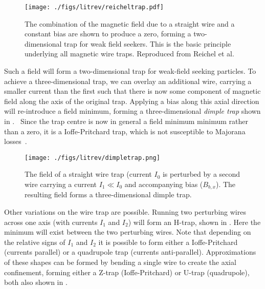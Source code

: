 \begin{figure}
  \texttt{[image: ./figs/litrev/reicheltrap.pdf]}
  \caption{The combination of the magnetic field due to a straight wire and a
  constant bias are shown to produce a zero, forming a two-dimensional trap for
  weak field seekers. This is the basic principle underlying all magnetic wire
  traps. Reproduced from Reichel et al.~\cite{Reichel1999}
  }
  \label{litrev:fig:reicheltrap}
\end{figure}

Such a field will form a two-dimensional trap for weak-field seeking particles.
To achieve a three-dimensional trap, we can overlay an additional wire,
carrying a smaller current than the first such that there is now some component
of magnetic field along the axis of the original trap. Applying a bias along
this axial direction will re-introduce a field minimum, forming a three-dimensional
\emph{dimple trap} shown in .~\cite{2011Ac}
Since the trap centre is now in general a field minimum minimum rather than a
zero, it is a Ioffe-Pritchard trap, which is not susceptible to Majorana
losses~\cite{PhysRevLett.51.1336}.

\begin{figure}
  \texttt{[image: ./figs/litrev/dimpletrap.png]}
  \caption{The field of a straight wire trap (current $I_0$ is perturbed by a
  second wire carrying a current $I_1 \ll I_0 $ and accompanying bias
  ($B_{b,x}$). The resulting field forms a three-dimensional dimple trap.
  }
  \label{litrev:fig:dimpletrap}
\end{figure}

Other variations on the wire trap are possible. Running two perturbing wires
across one axis (with currents $I_1$ and $I_2$) will form an H-trap, shown in
. Here the minimum will exist between the
two perturbing wires. Note that depending on the relative signs of $I_1$ and
$I_2$ it is possible to form either a Ioffe-Pritchard (currents parallel) or a
quadrupole trap (currents anti-parallel). Approximations of these shapes can be
formed by bending a single wire to create the axial confinement, forming either
a Z-trap (Ioffe-Pritchard) or U-trap (quadrupole), both also shown in
.

